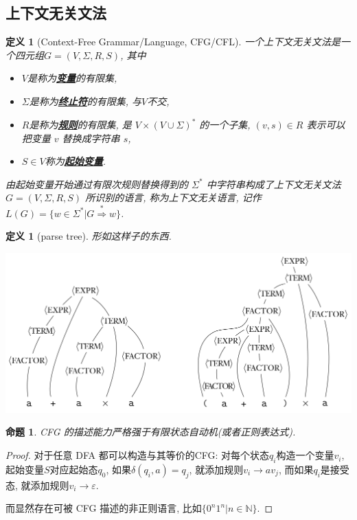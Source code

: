 \documentclass[8pt]{article}
\theoremstyle{compact}
\newtheorem{definition}[theorem]{定义}
\newtheorem{proposition}[theorem]{命题}
\def\obj#1{\textbf{\uline{#1}}}
\begin{document}
\subsection{上下文无关文法}
\begin{definition}[Context-Free Grammar/Language, CFG/CFL]
	一个上下文无关文法是一个四元组$G = (V, \Sigma, R, S)$, 其中
	\begin{itemize}
		\item $V$是称为\obj{变量}的有限集, 
		\item $\Sigma$是称为\obj{终止符}的有限集, 与$V$不交, 
		\item $R$是称为\obj{规则}的有限集, 是 $V \times (V \cup \Sigma)^*$ 的一个子集, $(v, s) \in R$ 表示可以把变量 $v$ 替换成字符串 $s$, 
		\item $S \in V$称为\obj{起始变量}. 
	\end{itemize}

	由起始变量开始通过有限次规则替换得到的 $\Sigma^*$ 中字符串构成了上下文无关文法 $G = (V, \Sigma, R, S)$ 所识别的语言, 称为上下文无关语言, 记作 $L(G) = \{w \in \Sigma^* | G \overset{*}{\Rightarrow} w\}$.
\end{definition}
\begin{definition}[parse tree]
	形如这样子的东西.
	\begin{center}
		\includegraphics*[scale=0.3]{pic/parse_tree.png}	
	\end{center}
\end{definition}
\begin{proposition}
	CFG 的描述能力严格强于有限状态自动机(或者正则表达式). 
\end{proposition}
\begin{proof}
	对于任意 DFA 都可以构造与其等价的CFG: 对每个状态$q_i$构造一个变量$v_i$, 起始变量$S$对应起始态$q_0$, 如果$\delta(q_i, a) = q_j$, 就添加规则$v_i \to av_j$, 而如果$q_i$是接受态, 就添加规则$v_i \to \varepsilon$. 

	而显然存在可被 CFG 描述的非正则语言, 比如$\{0^n1^n | n \in \mathbb N\}$. 
\end{proof}
\end{document}
